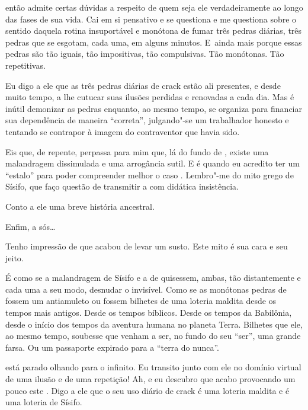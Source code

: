  então admite certas dúvidas a respeito de quem seja ele
verdadeiramente ao longo das fases de sua vida. Cai em si pensativo e se
questiona e me questiona sobre o sentido daquela rotina insuportável e
monótona de fumar três pedras diárias, três pedras que se esgotam, cada
uma, em alguns minutos. E~ainda mais porque essas pedras são tão iguais,
tão impositivas, tão compulsivas. Tão monótonas. Tão repetitivas.

Eu digo a ele que as três pedras diárias de crack estão ali presentes, e
desde muito tempo, a lhe cutucar suas ilusões perdidas e renovadas a
cada dia. Mas é inútil demonizar as pedras enquanto, ao mesmo tempo, 
se organiza para financiar sua dependência de maneira ``correta'',
julgando"-se um trabalhador honesto e tentando se contrapor à imagem do
contraventor que havia sido.

Eis que, de repente, perpassa para mim que, lá do fundo de , existe
uma malandragem dissimulada e uma arrogância sutil. E é quando eu
acredito ter um ``estalo'' para poder compreender melhor o caso .
Lembro"-me do mito grego de Sísifo, que faço questão de transmitir a 
com didática insistência.

Conto a ele uma breve história ancestral.


Enfim, a sós…

Tenho impressão de que  acabou de levar um susto. Este mito é sua cara
e seu jeito.

É como se a malandragem de Sísifo e a de  quisessem, ambas, tão
distantemente e cada uma a seu modo, desnudar o invisível. Como se as
monótonas pedras de  fossem um antiamuleto ou fossem bilhetes de uma
loteria maldita desde os tempos mais antigos. Desde os tempos bíblicos.
Desde os tempos da Babilônia, desde o início dos tempos da aventura
humana no planeta Terra. Bilhetes que ele, ao mesmo tempo, soubesse que
venham a ser, no fundo do seu ``ser'', uma grande farsa. Ou um
passaporte expirado para a ``terra do nunca''.

 está parado olhando para o infinito. Eu transito junto com ele no
domínio virtual de uma ilusão e de uma repetição! Ah, e eu descubro que
acabo provocando um pouco este . Digo a ele que o seu uso diário de
crack é uma loteria maldita e é uma loteria de Sísifo.

